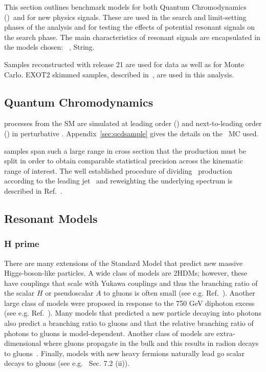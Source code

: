 This section outlines benchmark models for both Quantum Chromodynamics (\QCD)~and for new
physics signals. These are used in the search and limit-setting phases of the
analysis and for testing the effects of potential
resonant signals on the search phase.
The main characteristics of resonant
signals are encapsulated in the models chosen:
\Hprime\ , String.

Samples reconstructed with release 21 are used for data as well as for Monte Carlo. EXOT2 skimmed samples, described in~\cite{ATLAS:Exot2Derivation}, are used in this analysis.

\subsection{Quantum Chromodynamics}
\label{qcdsamps}
\QCD processes from the SM are simulated at leading order (\LO)
and next-to-leading order (\NLO) in perturbative \QCD. 
Appendix~\ref{sec:qcdsample} gives the details on the \QCD~MC used.

\QCD samples span such a large range in cross section that the
production must be split in order to obtain comparable statistical precision
across the kinematic range of interest.
The well established procedure of dividing \QCD~production according
to the leading jet \pT~and reweighting the underlying spectrum
is described in Ref.~\cite{Marshall:2016630}.  

\subsection{Resonant Models}
\subsubsection{H prime}
\label{sec:hprime}

There are many extensions of the Standard Model that predict new massive Higgs-boson-like particles.  A wide class of models are 2HDMs; however, these have couplings that scale with Yukawa couplings and thus the branching ratio of the scalar $H$ or pseudoscalar $A$ to gluons is often small (see e.g. Ref.~\cite{Harlander:2013qxa}).   Another large class of models were proposed in response to the 750 GeV diphoton excess (see e.g. Ref.~\cite{PhysRevLett.116.150001}).  Many models that predicted a new particle decaying into photons also predict a branching ratio to gluons and that the relative branching ratio of photons to gluons is model-dependent.   Another class of models are extra-dimensional where gluons propagate in the bulk and this results in radion decays to gluons~\cite{Agashe:2020wph}.  Finally, models with new heavy fermions naturally lead go scalar decays to gluons (see e.g.~\cite{Curtin:2013fra} Sec. 7.2 (ii)).

